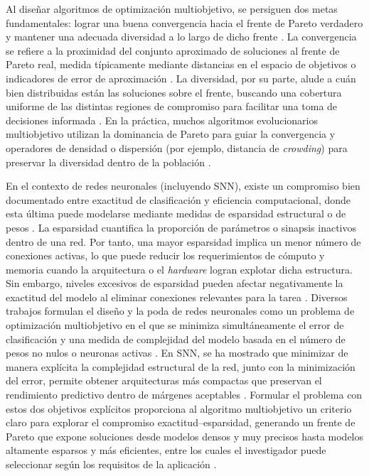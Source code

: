 Al diseñar algoritmos de optimización multiobjetivo, se persiguen dos metas fundamentales: lograr una buena convergencia hacia el frente de Pareto verdadero y mantener una adecuada diversidad a lo largo de dicho frente \cite{Panichella2022paretofront}. La convergencia se refiere a la proximidad del conjunto aproximado de soluciones al frente de Pareto real, medida típicamente mediante distancias en el espacio de objetivos o indicadores de error de aproximación \cite{Panichella2022paretofront,Gong2020evolutionaryoptimization}. La diversidad, por su parte, alude a cuán bien distribuidas están las soluciones sobre el frente, buscando una cobertura uniforme de las distintas regiones de compromiso para facilitar una toma de decisiones informada \cite{Panichella2022paretofront}. En la práctica, muchos algoritmos evolucionarios multiobjetivo utilizan la dominancia de Pareto para guiar la convergencia y operadores de densidad o dispersión (por ejemplo, distancia de \textit{crowding}) para preservar la diversidad dentro de la población \cite{Gong2020evolutionaryoptimization, Panichella2022paretofront}.

En el contexto de redes neuronales (incluyendo SNN), existe un compromiso bien documentado entre exactitud de clasificación y eficiencia computacional, donde esta última puede modelarse mediante medidas de esparsidad estructural o de pesos \cite{Suidgeest2024snnthesis, khan2026hierarchicalimportanceguidedmultiobjectiveevolutionary}. La esparsidad cuantifica la proporción de parámetros o sinapsis inactivos dentro de una red. Por tanto, una mayor esparsidad implica un menor número de conexiones activas, lo que puede reducir los requerimientos de cómputo y memoria cuando la arquitectura o el \textit{hardware} logran explotar dicha estructura. Sin embargo, niveles excesivos de esparsidad pueden afectar negativamente la exactitud del modelo al eliminar conexiones relevantes para la tarea \cite{dimovska2020multiobjectiveoptimizationsizeresilience, Suidgeest2024snnthesis}. Diversos trabajos formulan el diseño y la poda de redes neuronales como un problema de optimización multiobjetivo en el que se minimiza simultáneamente el error de clasificación y una medida de complejidad del modelo basada en el número de pesos no nulos o neuronas activas \cite{Yue2025CNEA, MOEA/CKF, khan2026hierarchicalimportanceguidedmultiobjectiveevolutionary, dimovska2020multiobjectiveoptimizationsizeresilience}. En SNN, se ha mostrado que minimizar de manera explícita la complejidad estructural de la red, junto con la  minimización del error, permite obtener arquitecturas más compactas que preservan el rendimiento predictivo dentro de márgenes aceptables \cite{khan2026hierarchicalimportanceguidedmultiobjectiveevolutionary, dimovska2020multiobjectiveoptimizationsizeresilience}. Formular el problema con estos dos objetivos explícitos proporciona al algoritmo multiobjetivo un criterio claro para explorar el compromiso exactitud–esparsidad, generando un frente de Pareto que expone soluciones desde modelos densos y muy precisos hasta modelos altamente esparsos y más eficientes, entre los cuales el investigador puede seleccionar según los requisitos de la aplicación \cite{Suidgeest2024snnthesis, dimovska2020multiobjectiveoptimizationsizeresilience}.


